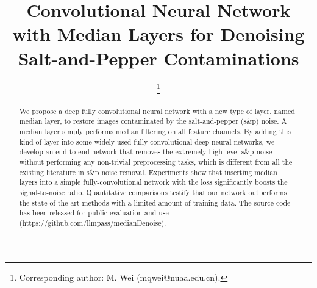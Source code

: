 \documentclass[journal]{IEEEtran}
\begin{document}
\title{Convolutional Neural Network with Median Layers for Denoising Salt-and-Pepper Contaminations}


\author{
      \thanks{
      Corresponding author: M. Wei (mqwei@nuaa.edu.cn).}}



















\maketitle

\begin{abstract}
We propose a deep fully convolutional neural network with a new type of layer, named median layer, to restore images contaminated by the salt-and-pepper (s\&p) noise. A median layer simply performs median filtering on all feature channels. By adding this kind of layer into some widely used fully convolutional deep neural networks, we develop an end-to-end network that removes the extremely high-level s\&p noise without performing any non-trivial preprocessing tasks, which is different from all the existing literature in s\&p noise removal. Experiments show that inserting median layers into a simple fully-convolutional network with the  loss significantly boosts the signal-to-noise ratio. Quantitative comparisons testify that our network outperforms the state-of-the-art methods with a limited amount of training data. The source code has been released for public evaluation and use (https://github.com/llmpass/medianDenoise).
\end{abstract}
\end{document}
